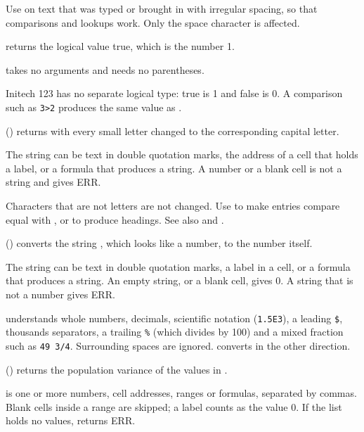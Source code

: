 Use  on text that was typed or brought in with irregular spacing, so that comparisons and lookups work. Only the space character is affected.

\Examples
{}

 returns the logical value true, which is the number 1.

 takes no arguments and needs no parentheses.

Initech 123 has no separate logical type: true is 1 and false is 0. A comparison such as \texttt{3>2} produces the same value as .

\Examples
{}

() returns  with every small letter changed to the corresponding capital letter.

The string can be text in double quotation marks, the address of a cell that holds a label, or a formula that produces a string. A number or a blank cell is not a string and gives ERR.

Characters that are not letters are not changed. Use  to make entries compare equal with , or to produce headings. See also  and .

\Examples
{}

() converts the string , which looks like a number, to the number itself.

The string can be text in double quotation marks, a label in a cell, or a formula that produces a string. An empty string, or a blank cell, gives 0. A string that is not a number gives ERR.

 understands whole numbers, decimals, scientific notation (\texttt{1.5E3}), a leading \texttt{\$}, thousands separators, a trailing \texttt{\%} (which divides by 100) and a mixed fraction such as \texttt{49 3/4}. Surrounding spaces are ignored.  converts in the other direction.

\Examples
{}

() returns the population variance of the values in .

 is one or more numbers, cell addresses, ranges or formulas, separated by commas. Blank cells inside a range are skipped; a label counts as the value 0. If the list holds no values,  returns ERR.


